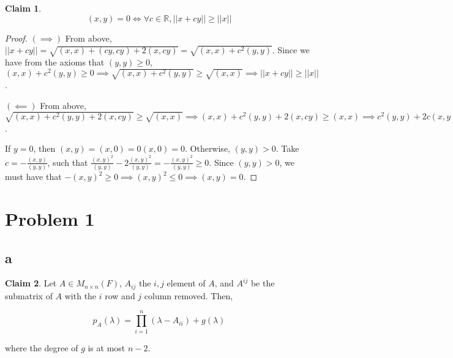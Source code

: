 \documentclass[12pt,letterpaper]{article}
\theoremstyle{definition}
\newtheorem*{claim}{Claim}
\newcommand{\R}{\mathbb{R}}
\begin{document}
\begin{claim}
  \[
    (x, y) = 0 \iff \forall c \in \R, ||x + cy|| \geq ||x||
  \]
\end{claim}

\begin{proof}
  $(\implies)$ From above, $||x + cy|| = \sqrt{(x,x) + (cy, cy) + 2(x, cy)} =
  \sqrt{(x,x) + c^2(y,y)}$. Since we have from the axioms that $(y,y) \geq 0$,
  $(x,x) + c^2(y,y) \geq 0 \implies \sqrt{(x,x) + c^2(y,y)} \geq \sqrt{(x,x)}
  \implies ||x + cy|| \geq ||x||$. 

  $(\impliedby)$ From above, $\sqrt{(x,x) + c^2(y,y) + 2(x,cy)} \geq \sqrt{(x,x)} \implies
  (x,x) + c^2(y,y) + 2(x, cy) \geq (x,x) \implies c^2(y,y) + 2c(x,y) \geq 0$.

  If $y = 0$, then $(x, y) = (x, 0) = 0(x, 0) = 0$. Otherwise, $(y,y) > 0$. Take
  $c = -\frac{(x,y)}{(y,y)}$, such that $\frac{(x,y)^2}{(y,y)} -
  2\frac{(x,y)^2}{(y,y)} = -\frac{(x,y)^2}{(y,y)} \geq 0$. Since $(y,y) > 0$, we
  must have that $-(x,y)^2 \geq 0  \implies (x,y)^2 \leq 0 \implies (x,y) = 0$.
\end{proof}

\section*{Problem 1}

\subsection*{a}

\begin{claim}
  Let $A \in M_{n \times n}(F)$, $A_{ij}$ the $i,j$ element of $A$, and $A^{ij}$
  be the submatrix of $A$ with the $i$ row and $j$ column removed. Then,

  \[
    p_A(\lambda) = \prod_{i=1}^n(\lambda - A_{ii}) + g(\lambda)
  \]

  where the degree of $g$ is at most $n - 2$.
\end{claim}
\end{document}

